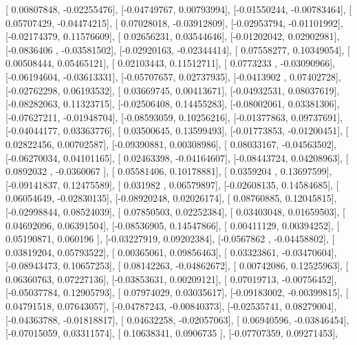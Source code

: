 \documentclass{article}
\begin{document}
       [ 0.00807848, -0.02255476],
       [-0.04749767,  0.00793994],
       [-0.01550244, -0.00783464],
       [ 0.05707429, -0.04474215],
       [ 0.07028018, -0.03912809],
       [-0.02953794, -0.01101992],
       [-0.02174379,  0.11576609],
       [ 0.02656231,  0.03544646],
       [-0.01202042,  0.02902981],
       [-0.0836406 , -0.03581502],
       [-0.02920163, -0.02344414],
       [ 0.07558277,  0.10349054],
       [ 0.00508444,  0.05465121],
       [ 0.02103443,  0.11512711],
       [ 0.0773233 , -0.03090966],
       [-0.06194604, -0.03613331],
       [-0.05707657,  0.02737935],
       [-0.0413902 ,  0.07402728],
       [-0.02762298,  0.06193532],
       [ 0.03669745,  0.00413671],
       [-0.04932531,  0.08037619],
       [-0.08282063,  0.11323715],
       [-0.02506408,  0.14455283],
       [-0.08002061,  0.03381306],
       [-0.07627211, -0.01948704],
       [-0.08593059,  0.10256216],
       [-0.01377863,  0.09737691],
       [-0.04044177,  0.03363776],
       [ 0.03500645,  0.13599493],
       [-0.01773853, -0.01200451],
       [ 0.02822456,  0.00702587],
       [-0.09390881,  0.00308986],
       [ 0.08033167, -0.04563502],
       [-0.06270034,  0.04101165],
       [ 0.02463398, -0.04164607],
       [-0.08443724,  0.04208963],
       [ 0.0892032 , -0.0360067 ],
       [ 0.05581406,  0.10178881],
       [ 0.0359204 ,  0.13697599],
       [-0.09141837,  0.12475589],
       [ 0.031982  ,  0.06579897],
       [-0.02608135,  0.14584685],
       [ 0.06054649, -0.02830135],
       [-0.08920248,  0.02026174],
       [ 0.08760885,  0.12045815],
       [-0.02998844,  0.08524039],
       [ 0.07850503,  0.02252384],
       [ 0.03403048,  0.01659503],
       [ 0.04692096,  0.06391504],
       [-0.08536905,  0.14547866],
       [ 0.00411129,  0.00394252],
       [ 0.05190871,  0.060196  ],
       [-0.03227919,  0.09202384],
       [-0.0567862 , -0.04458802],
       [ 0.03819204,  0.05793522],
       [ 0.00365061,  0.09856463],
       [ 0.03323861, -0.03470604],
       [-0.08943473,  0.10657253],
       [ 0.08142263, -0.04862672],
       [ 0.00742086,  0.12525963],
       [ 0.06360763,  0.07227136],
       [-0.03853631,  0.00209121],
       [ 0.07019713, -0.00756452],
       [-0.05037784,  0.12905793],
       [ 0.07974029,  0.03035617],
       [-0.09183002, -0.00399815],
       [ 0.04791518,  0.07643057],
       [-0.04787243, -0.00840373],
       [-0.02535741,  0.08279004],
       [-0.04363788, -0.01818817],
       [ 0.04632258, -0.02057063],
       [ 0.06940596, -0.03846454],
       [-0.07015059,  0.03311574],
       [ 0.10638341,  0.0906735 ],
       [-0.07707359,  0.09271453],
\end{document}
